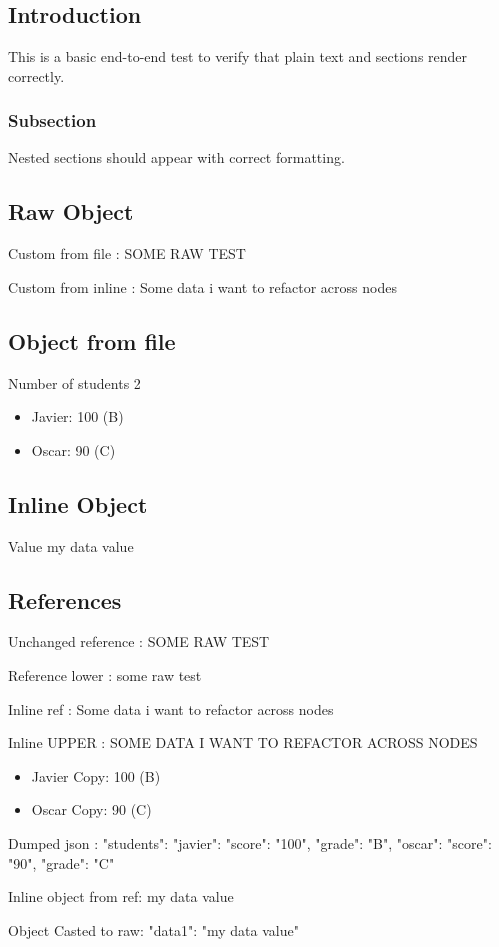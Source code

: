 \documentclass[11pt]{report}
\begin{document}
\chapter{}

\section{Introduction}

This is a basic end-to-end test to verify that plain text and sections render correctly.

\subsection{Subsection}

Nested sections should appear with correct formatting.

\section{Raw Object}

Custom from file : SOME RAW TEST

Custom from inline : Some data i want to refactor across nodes

\section{Object from file}

Number of students 2

\begin{itemize}
  \item Javier: 100 (B)
  \item Oscar: 90 (C)
\end{itemize}

\section{Inline Object}

Value my data value

\section{References}

Unchanged reference : SOME RAW TEST

Reference lower : some raw test

Inline ref : Some data i want to refactor across nodes

Inline UPPER : SOME DATA I WANT TO REFACTOR ACROSS NODES


\begin{itemize}
  \item Javier Copy: 100 (B)

  \item Oscar Copy: 90 (C)

\end{itemize}


Dumped json : {"students": {"javier": {"score": "100", "grade": "B"}, "oscar": {"score": "90", "grade": "C"}}}

Inline object from ref: my data value

Object Casted to raw: {"data1": "my data value"}
\end{document}
